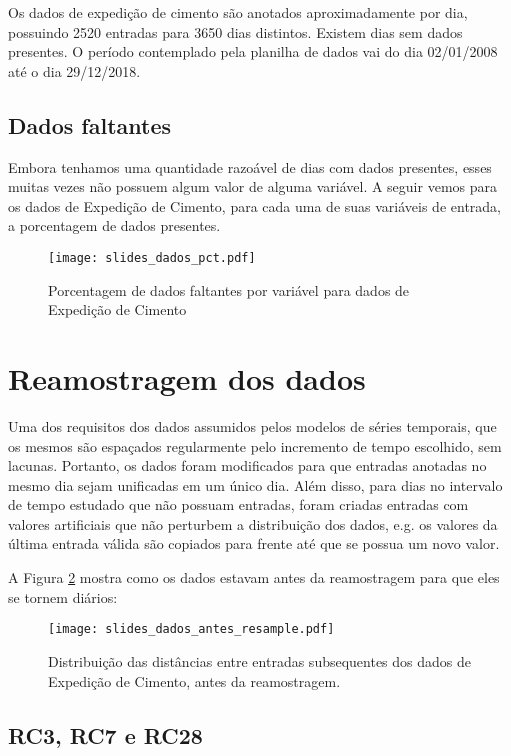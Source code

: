 Os dados de expedição de cimento são anotados aproximadamente por dia, possuindo 2520
entradas para 3650 dias distintos. Existem dias sem dados presentes. O
período contemplado pela planilha de dados vai do dia 02/01/2008 até o dia 29/12/2018.

\subsection{Dados faltantes}

Embora tenhamos uma quantidade razoável de dias com dados presentes, esses muitas vezes não possuem algum valor de alguma variável.
A seguir vemos para os dados de Expedição de Cimento, para cada uma de suas variáveis de entrada, a porcentagem de dados presentes. 


\begin{figure}[H]
  \centering
  \texttt{[image: slides\_dados\_pct.pdf]}
  \caption{Porcentagem de dados faltantes por variável para dados de Expedição de Cimento}
  \label{fig:dadosfalta}
\end{figure}


\section{Reamostragem dos dados}

Uma dos requisitos dos dados assumidos pelos modelos de séries temporais, que os mesmos
são espaçados regularmente pelo incremento de tempo escolhido, sem lacunas.
Portanto, os dados foram modificados para que entradas anotadas no mesmo dia
sejam unificadas em um único dia. Além disso, para dias no intervalo de tempo
estudado que não possuam entradas, foram criadas entradas com valores
artificiais que não perturbem a distribuição dos dados, e.g. os valores da
última entrada válida são copiados para frente até que se possua um novo valor.

A Figura \ref{fig:reamos} mostra como os dados estavam antes da reamostragem
para que eles se tornem diários: 

\begin{figure}[H]
  \centering
  \texttt{[image: slides\_dados\_antes\_resample.pdf]}
  \caption{Distribuição das distâncias entre entradas subsequentes dos dados de Expedição de Cimento, antes da reamostragem.}
  \label{fig:reamos}
\end{figure}



\subsection{RC3, RC7 e RC28}

